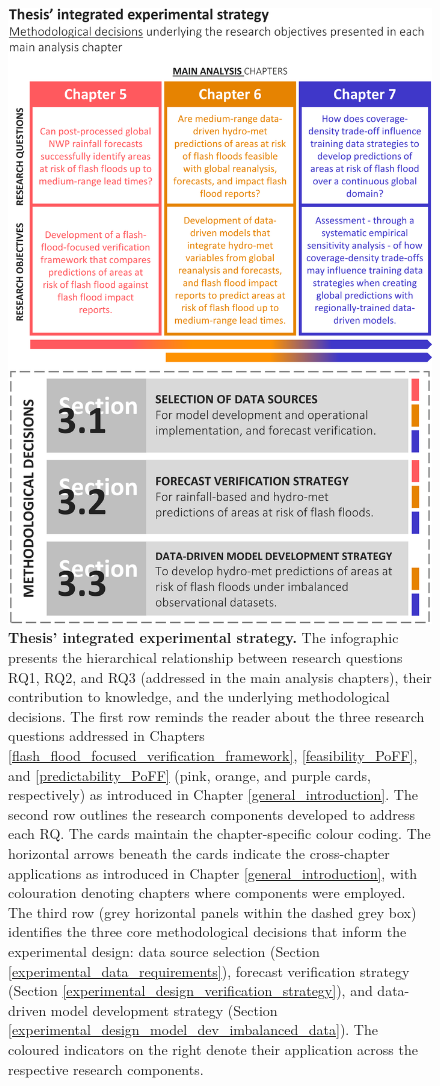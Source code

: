 \begin{figure}[htbp]
\centering
\includegraphics[width=\textwidth]{chapter_03/figures/integrated_experimental_strategy.png}
\caption{\textbf{Thesis' integrated experimental strategy.} The infographic presents the hierarchical relationship between research questions RQ1, RQ2, and RQ3 (addressed in the main analysis chapters), their contribution to knowledge, and the underlying methodological decisions. The first row reminds the reader about the three research questions addressed in Chapters \ref{flash_flood_focused_verification_framework}, \ref{feasibility_PoFF}, and \ref{predictability_PoFF} (pink, orange, and purple cards, respectively) as introduced in Chapter \ref{general_introduction}. The second row outlines the research components developed to address each RQ. The cards maintain the chapter-specific colour coding. The horizontal arrows beneath the cards indicate the cross-chapter applications as introduced in Chapter \ref{general_introduction}, with colouration denoting chapters where components were employed. The third row (grey horizontal panels within the dashed grey box) identifies the three core methodological decisions that inform the experimental design: data source selection (Section \ref{experimental_data_requirements}), forecast verification strategy (Section \ref{experimental_design_verification_strategy}), and data-driven model development strategy (Section \ref{experimental_design_model_dev_imbalanced_data}). The coloured indicators on the right denote their application across the respective research components.}

\end{figure}
